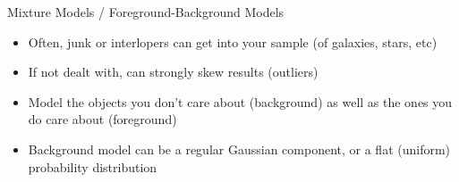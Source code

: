 \documentclass[compress,t]{beamer}
\begin{document}
\begin{frame}{Mixture Models / Foreground-Background Models}
  \begin{itemize}
    \item Often, \alert{junk} or \alert{interlopers} can get into your
      sample (of galaxies, stars, etc)
    \item If not dealt with, can strongly skew results (outliers)
    \item \alert{Model} the objects you don't care about (background)
      \alert{as well as} the ones you do care about (foreground)
    \item Background model can be a regular Gaussian component, or a
      flat (uniform) probability distribution
  \end{itemize}
  \begin{center}
  \end{center}
\end{frame}
\end{document}
